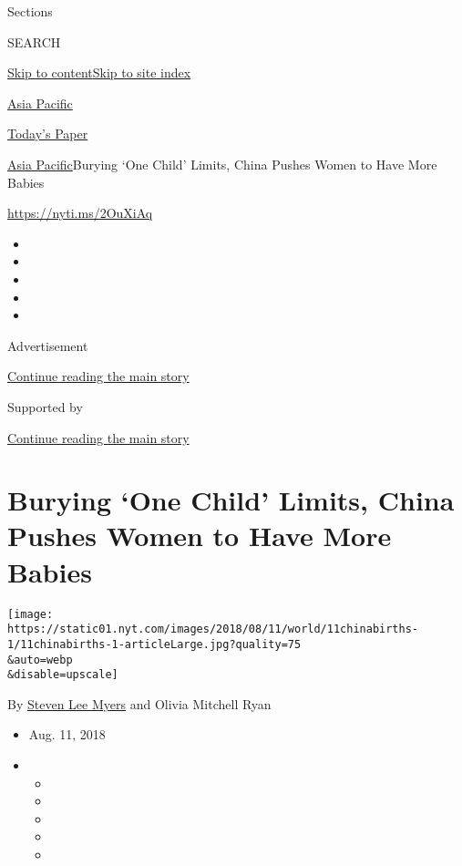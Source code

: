 Sections

SEARCH

\protect\hyperlink{site-content}{Skip to
content}\protect\hyperlink{site-index}{Skip to site index}

\href{https://www.nytimes.com/section/world/asia}{Asia Pacific}

\href{https://myaccount.nytimes.com/auth/login?response_type=cookie\&client_id=vi}{}

\href{https://www.nytimes.com/section/todayspaper}{Today's Paper}

\href{/section/world/asia}{Asia Pacific}\textbar{}Burying `One Child'
Limits, China Pushes Women to Have More Babies

\url{https://nyti.ms/2OuXiAq}

\begin{itemize}
\item
\item
\item
\item
\item
\end{itemize}

Advertisement

\protect\hyperlink{after-top}{Continue reading the main story}

Supported by

\protect\hyperlink{after-sponsor}{Continue reading the main story}

\hypertarget{burying-one-child-limits-china-pushes-women-to-have-more-babies}{%
\section{Burying `One Child' Limits, China Pushes Women to Have More
Babies}\label{burying-one-child-limits-china-pushes-women-to-have-more-babies}}

\texttt{[image: https://static01.nyt.com/images/2018/08/11/world/11chinabirths-1/11chinabirths-1-articleLarge.jpg?quality=75\\\&auto=webp\\\&disable=upscale]}

By \href{https://www.nytimes.com/by/steven-lee-myers}{Steven Lee Myers}
and Olivia Mitchell Ryan

\begin{itemize}
\item
  Aug. 11, 2018
\item
  \begin{itemize}
  \item
  \item
  \item
  \item
  \item
  \end{itemize}
\end{itemize}

